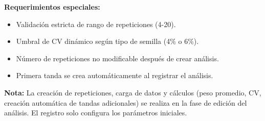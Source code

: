 \vspace{0.5em}
\noindent\textbf{Requerimientos especiales:}
\begin{itemize}[nosep]
    \item Validación estricta de rango de repeticiones (4-20).
    \item Umbral de CV dinámico según tipo de semilla (4\% o 6\%).
    \item Número de repeticiones no modificable después de crear análisis.
    \item Primera tanda se crea automáticamente al registrar el análisis.
\end{itemize}

\vspace{0.5em}
\noindent\textbf{Nota:} La creación de repeticiones, carga de datos y cálculos (peso promedio, CV, creación automática de tandas adicionales) se realiza en la fase de edición del análisis. El registro solo configura los parámetros iniciales.

